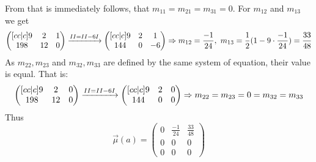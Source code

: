         From that is immediately follows, that $m_{11} = m_{21} = m_{31} = 0$. For $m_{12}$ and $m_{13}$ we get 
        \[   \begin{pmatrix}[c c | c]
                9 & 2 & 1 \\
                198 & 12 & 0 \\
            \end{pmatrix} 
            \xrightarrow{\rom{2} = \rom{2} - 6\rom{1}} 
            \begin{pmatrix}[c c | c]
                9 & 2 & 1 \\
                144 & 0 & -6 \\
            \end{pmatrix} 
            \Rightarrow m_{12} = \frac{-1}{24}, \ m_{13} = \frac{1}{2}(1 - 9 \cdot \frac{-1}{24}) = \frac{33}{48}
        \]
        As $m_{22}, m_{23}$ and $m_{32}, m_{33}$ are defined by the same system of equation, their value is equal. That is:
         \[   \begin{pmatrix}[c c | c]
                9 & 2 & 0 \\
                198 & 12 & 0 \\
            \end{pmatrix} 
            \xrightarrow{\rom{2} = \rom{2} - 6\rom{1}} 
            \begin{pmatrix}[c c | c]
                9 & 2 & 0 \\
                144 & 0 & 0 \\
            \end{pmatrix} 
            \Rightarrow m_{22} = m_{23} = 0 = m_{32} = m_{33} 
        \]
        Thus \[ \overrightarrow{\mu}(a) = 
            \begin{pmatrix}
                0 & \frac{-1}{24} & \frac{33}{48} \\
                0 & 0 & 0 \\
                0 & 0 & 0 
            \end{pmatrix} \]
            
